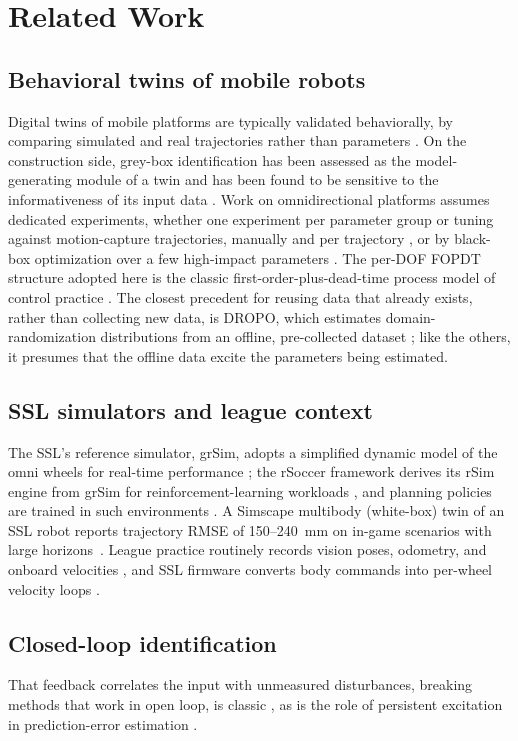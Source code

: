 \section{Related Work}
\label{sec:related}

\subsection{Behavioral twins of mobile robots}
Digital twins of mobile platforms are typically validated behaviorally, by comparing simulated and real trajectories rather than parameters \cite{barioni2024development,yang2025digital}. On the construction side, grey-box identification has been assessed as the model-generating module of a twin and has been found to be sensitive to the informativeness of its input data \cite{brennan2025greybox}. Work on omnidirectional platforms assumes dedicated experiments, whether one experiment per parameter group \cite{giro2023otbot} or tuning against motion-capture trajectories, manually and per trajectory
\cite{wiedemann2024simulation}, or by black-box optimization over a few high-impact parameters \cite{wiedemann2025automated}. The per-DOF FOPDT structure adopted here is the classic first-order-plus-dead-time process model of control practice \cite{astrom1995pid}. The closest precedent for reusing
data that already exists, rather than collecting new data, is DROPO, which estimates domain-randomization distributions from an offline, pre-collected dataset \cite{tiboni2023dropo}; like the others, it presumes that the offline data excite the parameters being estimated.

\subsection{SSL simulators and league context}
The SSL's reference simulator, grSim, adopts a simplified dynamic model of the omni wheels for real-time performance \cite{monajjemi2012grsim}; the rSoccer framework derives its rSim engine from grSim for reinforcement-learning workloads \cite{martins2021rsoccer}, and planning policies are trained in such environments \cite{machado2025planning}. A Simscape multibody (white-box) twin of an SSL robot reports trajectory RMSE of 150--240~mm on in-game scenarios with large horizons~\cite{araujo2025digital}. League practice routinely records vision poses, odometry, and onboard velocities \cite{melo2023dataset}, and SSL firmware
converts body commands into per-wheel velocity loops \cite{freiberger2024implementation}.

\subsection{Closed-loop identification}
That feedback correlates the input with unmeasured disturbances, breaking methods that work in open loop, is classic \cite{gustavsson1977identification,vandenhof1998closedloop,forssell1999closedloop}, as is the role of persistent excitation in prediction-error estimation \cite{ljung1999system}.